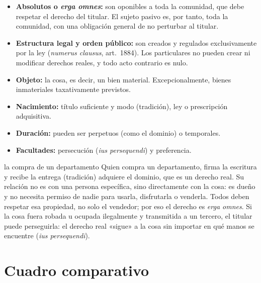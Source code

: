 \documentclass[12pt,oneside]{book}
\begin{document}
\begin{itemize}
    \item \textbf{Absolutos o \textit{erga omnes}:} son oponibles a toda la comunidad, que debe respetar el derecho del titular. El sujeto pasivo es, por tanto, toda la comunidad, con una obligación general de no perturbar al titular.
    \item \textbf{Estructura legal y orden público:} son creados y regulados exclusivamente por la ley (\textit{numerus clausus}, art.~1884). Los particulares no pueden crear ni modificar derechos reales, y todo acto contrario es nulo.
    \item \textbf{Objeto:} la cosa, es decir, un bien material. Excepcionalmente, bienes inmateriales taxativamente previstos.
    \item \textbf{Nacimiento:} título suficiente y modo (tradición), ley o prescripción adquisitiva.
    \item \textbf{Duración:} pueden ser perpetuos (como el dominio) o temporales.
    \item \textbf{Facultades:} persecución (\textit{ius persequendi}) y preferencia.
\end{itemize}

\begin{ejemplo}{la compra de un departamento}
Quien compra un departamento, firma la escritura y recibe la entrega (tradición) adquiere el dominio, que es un derecho real. Su relación no es con una persona específica, sino directamente con la cosa: es dueño y no necesita permiso de nadie para usarla, disfrutarla o venderla. Todos deben respetar esa propiedad, no solo el vendedor; por eso el derecho es \textit{erga omnes}. Si la cosa fuera robada u ocupada ilegalmente y transmitida a un tercero, el titular puede perseguirla: el derecho real «sigue» a la cosa sin importar en qué manos se encuentre (\textit{ius persequendi}).
\end{ejemplo}

\section{Cuadro comparativo}
\end{document}
